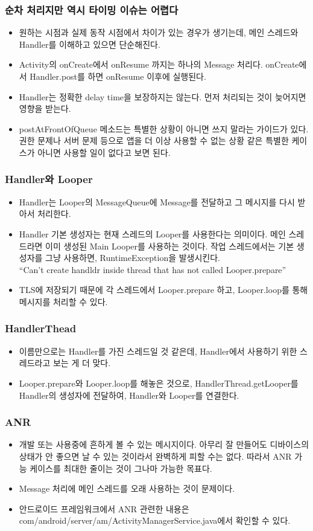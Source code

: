 \documentclass{beamer}
\begin{document}
\begin{frame}
\frametitle{순차 처리지만 역시 타이밍 이슈는 어렵다}
\begin{itemize}
\item 원하는 시점과 실제 동작 시점에서 차이가 있는 경우가 생기는데, 메인 스레드와 Handler를 이해하고 있으면 단순해진다.
\item Activity의 onCreate에서 onResume 까지는 하나의 Message 처리다. onCreate에서 Handler.post를 하면 onResume 이후에 실행된다.
\item Handler는 정확한 delay time을 보장하지는 않는다. 먼저 처리되는 것이 늦어지면 영향을 받는다.
\item postAtFrontOfQueue 메소드는 특별한 상황이 아니면 쓰지 말라는 가이드가 있다. 권한 문제나 서버 문제 등으로 앱을 더 이상 사용할 수 없는 상황 같은 특별한 케이스가 아니면 사용할 일이 없다고 보면 된다.
\end{itemize}
\end{frame}

\begin{frame}
\frametitle{Handler와 Looper}
\begin{itemize}
\item Handler는 Looper의 MessageQueue에 Message를 전달하고 그 메시지를 다시 받아서 처리한다.
\item Handler 기본 생성자는 현재 스레드의 Looper를 사용한다는 의미이다. 메인 스레드라면 이미 생성된 Main Looper를 사용하는 것이다. 작업 스레드에서는 기본 생성자를 그냥 사용하면, RuntimeException을 발생시킨다.\\
``Can't create handldr inside thread that has not called Looper.prepare''
\item TLS에 저장되기 때문에 각 스레드에서 Looper.prepare 하고, Looper.loop를 통해 메시지를 처리할 수 있다.
\end{itemize}
\end{frame}

\begin{frame}
\frametitle{HandlerThead}
\begin{itemize}
\item 이름만으로는 Handler를 가진 스레드일 것 같은데, Handler에서 사용하기 위한 스레드라고 보는 게 더 맞다.
\item Looper.prepare와 Looper.loop를 해놓은 것으로, HandlerThread.getLooper를   Handler의 생성자에 전달하여, Handler와 Looper를 연결한다.
\end{itemize}
\end{frame}

\begin{frame}
\frametitle{ANR}
\begin{itemize}
\item 개발 또는 사용중에 흔하게 볼 수 있는 메시지이다. 아무리 잘 만들어도 디바이스의 상태가 안 좋으면 날 수 있는 것이라서 완벽하게 피할 수는 없다. 따라서 ANR 가능 케이스를 최대한 줄이는 것이 그나마 가능한 목표다.
\item Message 처리에 메인 스레드를 오래 사용하는 것이 문제이다.
\item 안드로이드 프레임워크에서 ANR 관련한 내용은 com/android/server/am/ActivityManagerService.java에서 확인할 수 있다.
\end{itemize}
\end{frame}
\end{document}

